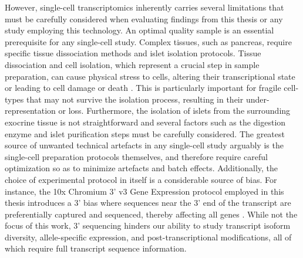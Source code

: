 \par However, single-cell transcriptomics inherently carries several limitations that must be carefully considered when evaluating findings from this thesis or any study employing this technology. An optimal quality sample is an essential prerequisite for any single-cell study. Complex tissues, such as pancreas, require specific tissue dissociation methods and islet isolation protocols. Tissue dissociation and cell isolation, which represent a crucial step in sample preparation, can cause physical stress to cells, altering their transcriptional state or leading to cell damage or death \textbf{\cite{neuschulz_singlecell_2023}} . This is particularly important for fragile cell-types that may not survive the isolation process, resulting in their under-representation or loss. Furthermore, the isolation of islets from the surrounding exocrine tissue is not straightforward and several factors such as the digestion enzyme and islet purification steps must be carefully considered. The greatest source of unwanted technical artefacts in any single-cell study arguably is the single-cell preparation protocols themselves, and therefore require careful optimization so as to minimize artefacts and batch effects. Additionally, the choice of experimental protocol in itself is a considerable source of bias. For instance, the 10x Chromium 3' v3 Gene Expression protocol employed in this thesis introduces a 3' bias where sequences near the 3' end of the transcript are preferentially captured and sequenced, thereby affecting all genes \textbf{\cite{mawla_navigating_2019}}. While not the focus of this work, 3' sequencing hinders our ability to study transcript isoform diversity, allele-specific expression, and post-transcriptional  modifications, all of which require full transcript sequence information.\\


